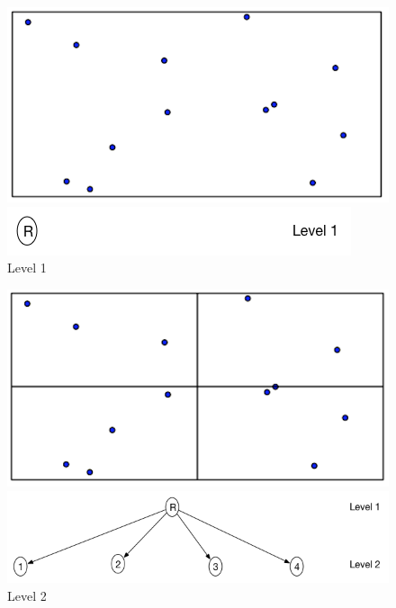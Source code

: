 \documentclass{article}
\begin{document}
 
  \begin{figure}[ht]
  \centering
  \begin{minipage}[b]{0.35\textwidth}
    \includegraphics[width=\textwidth]{Quadtree_basic_scenario1}
  \end{minipage}
  \hfill
  \begin{minipage}[b]{0.6\textwidth}
    \includegraphics[width=\textwidth]{1_1Quad_1_tree}
  \end{minipage}
   \caption{Level 1}
\end{figure}

\vspace{2cm}

\begin{figure}[ht]

  \centering
  \begin{minipage}[b]{0.35\textwidth}
    \includegraphics[width=\textwidth]{Quadtree_basic_scenario2}
  \end{minipage}
  \hfill
  \begin{minipage}[b]{0.6\textwidth}
    \includegraphics[width=\textwidth]{1_1Quad_2_tree}
  \end{minipage}
  \caption{Level 2}
\end{figure}
\end{document}
